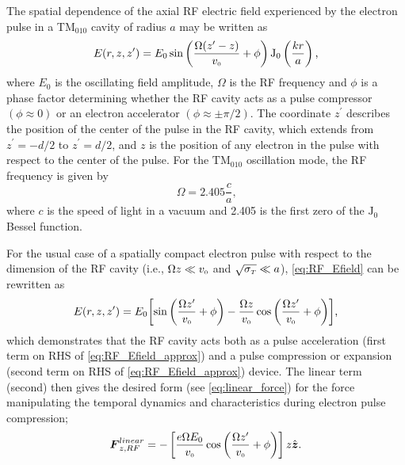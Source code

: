 The spatial dependence of the axial RF electric field experienced by the electron pulse in a TM$_{010}$ cavity of radius $a$ may be written as
\begin{equation} \label{eq:RF_Efield}
  E ( r , z , z^{\prime} ) = E_{0} \sin \left ( \frac{ \Omega ( z^{\prime} - z ) }{ v_{{\scriptscriptstyle 0}} } + \phi \right )\operatorname{J_{0}} \left ( \frac{ k r }{ a } \right ) \text{,}
\end{equation}
where $ E_{ 0 } $ is the oscillating field amplitude, $\Omega$ is the RF frequency and $\phi$ is a phase factor determining whether the RF cavity acts as a pulse compressor $ ( \phi \approx 0 ) $ or an electron accelerator $ ( \phi \approx \pm \pi/2 ) $.
The coordinate $z^{\prime} $ describes the position of the center of the pulse in the RF cavity, which extends from $ z^{\prime} = - d / 2 $ to $ z^{\prime} = d / 2 $, and $z$ is the position of any electron in the pulse with respect to the center of the pulse.
For the $\text{TM}_{010}$ oscillation mode, the RF frequency is given by
\begin{equation}
  \Omega = 2.405 \frac{ c }{a} \text{,}
\end{equation}
where $c$ is the speed of light in a vacuum and 2.405 is the first zero of the $\operatorname{ J_{0} }$ Bessel function.

For the usual case of a spatially compact electron pulse with respect to the dimension of the RF cavity (i.e., $ \Omega z \ll v_{{\scriptscriptstyle 0}} $ and $ \sqrt{\sigma_{{\scriptscriptstyle T}}} \ll a $), \ref{eq:RF_Efield} can be rewritten as
\begin{equation} \label{eq:RF_Efield_approx}
  E ( r , z , z^{\prime} ) = E_{0} \biggl [ \sin \left ( \frac{ \Omega z^{\prime} }{ v_{{\scriptscriptstyle 0}} } + \phi \right ) - \frac{ \Omega z }{ v_{{\scriptscriptstyle 0}} } \cos \left ( \frac{ \Omega z^{\prime} }{ v_{{\scriptscriptstyle 0}} } + \phi \right ) \biggr ] \text{,}
\end{equation}
which demonstrates that the RF cavity acts both as a pulse acceleration (first term on RHS of \ref{eq:RF_Efield_approx}) and a pulse compression or expansion (second term on RHS of \eqref{eq:RF_Efield_approx}) device. %
The linear term (second) then gives the desired form (see \ref{eq:linear_force}) for the force manipulating the temporal dynamics and characteristics during electron pulse compression;
\begin{equation} \label{eq:RF_Force_z}
  \boldsymbol{F}_{ z , RF }^{linear} = - \left [ \frac{ e \Omega E_{0} }{ v_{{\scriptscriptstyle 0}} } \cos \left ( \frac{ \Omega z^{\prime} }{ v_{{\scriptscriptstyle 0}} } + \phi \right ) \right ] z \hat{\operatorname{ \boldsymbol{z} }} \text{.}
\end{equation}


